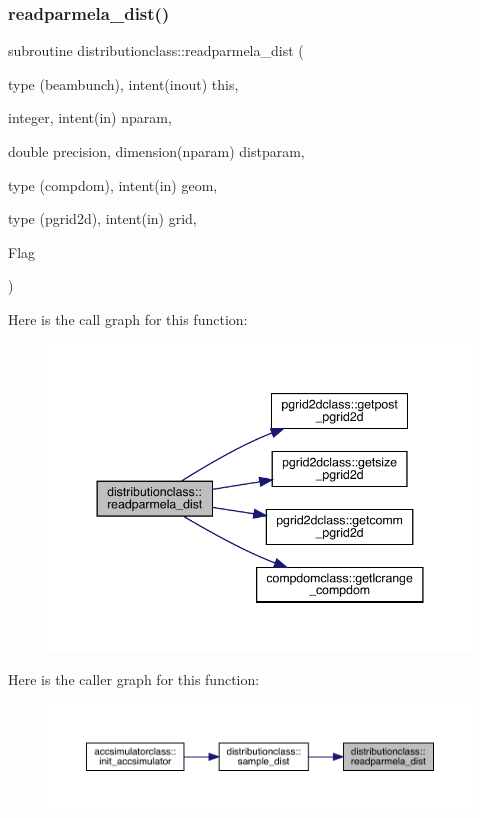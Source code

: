 \subsubsection{\texorpdfstring{readparmela\_dist()}{readparmela\_dist()}}
{\footnotesize\ttfamily subroutine distributionclass\+::readparmela\+\_\+dist (\begin{DoxyParamCaption}\item[{type (beambunch), intent(inout)}]{this,  }\item[{integer, intent(in)}]{nparam,  }\item[{double precision, dimension(nparam)}]{distparam,  }\item[{type (compdom), intent(in)}]{geom,  }\item[{type (pgrid2d), intent(in)}]{grid,  }\item[{}]{Flag }\end{DoxyParamCaption})}

Here is the call graph for this function\+:\nopagebreak
\begin{figure}[H]
\begin{center}
\leavevmode
\includegraphics[width=344pt]{namespacedistributionclass_aed89b043090c1817fc57baaa9604eb73_cgraph}
\end{center}
\end{figure}
Here is the caller graph for this function\+:\nopagebreak
\begin{figure}[H]
\begin{center}
\leavevmode
\includegraphics[width=350pt]{namespacedistributionclass_aed89b043090c1817fc57baaa9604eb73_icgraph}
\end{center}
\end{figure}
\mbox{\label{namespacedistributionclass_aee8dd99a29887ed3860bcce7adb87ce8}} 
